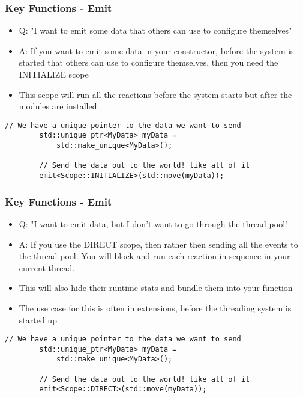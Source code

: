 \documentclass{beamer}
\begin{document}
\begin{frame}[fragile]
	\frametitle{Key Functions - Emit}
	\begin{itemize}
		\item Q: "I want to emit some data that others can use to configure themselves"
		\item A: If you want to emit some data in your constructor, before the system is started that others can use to configure themselves, then you need the INITIALIZE scope
		\item This scope will run all the reactions before the system starts but after the modules are installed
	\end{itemize}

	\begin{lstlisting}[language=nuclear]
		// We have a unique pointer to the data we want to send
		std::unique_ptr<MyData> myData = 
		    std::make_unique<MyData>();
		
		// Send the data out to the world! like all of it
		emit<Scope::INITIALIZE>(std::move(myData));
	\end{lstlisting}
\end{frame}

\begin{frame}[fragile]
	\frametitle{Key Functions - Emit}
	\begin{itemize}
		\item Q: "I want to emit data, but I don't want to go through the thread pool"
		\item A: If you use the DIRECT scope, then rather then sending all the events to the thread pool. You will block and run each reaction in sequence in your current thread.
		\item This will also hide their runtime stats and bundle them into your function
		\item The use case for this is often in extensions, before the threading system is started up
	\end{itemize}

	\begin{lstlisting}[language=nuclear]
		// We have a unique pointer to the data we want to send
		std::unique_ptr<MyData> myData = 
		    std::make_unique<MyData>();
		
		// Send the data out to the world! like all of it
		emit<Scope::DIRECT>(std::move(myData));
	\end{lstlisting}
\end{frame}
\end{document}
